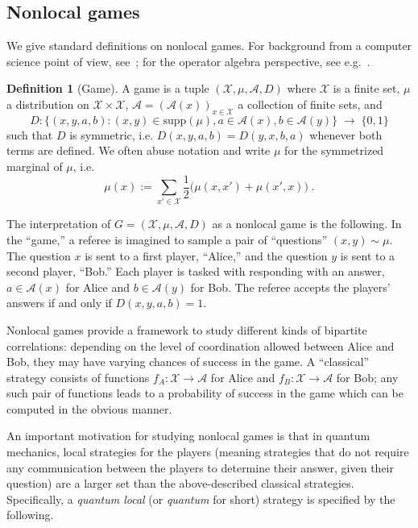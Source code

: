 \documentclass[11pt]{article}
\theoremstyle{definition}
\newtheorem{definition}[theorem]{Definition}
\newcommand{\mA}{\ensuremath{\mathcal{A}}}
\newcommand{\mX}{\ensuremath{\mathcal{X}}}
\begin{document}
\subsection{Nonlocal games}
\label{sec:nl-games}

We give standard definitions on nonlocal games. For background from a computer science point of view, see~\cite{cleve2004consequences}; for the operator algebra perspective, see e.g.~\cite{kim2018synchronous}.

\begin{definition}[Game]
A game is a tuple $(\mX,\mu,\mA,D)$ where $\mX$ is a finite set, $\mu$ a distribution on $\mX\times \mX$, $\mA=(\mA(x))_{x\in\mX}$ a collection of finite sets, and 
\[ D: \big\{ (x,y,a,b) : (x,y)\in\text{supp}(\mu),a\in\mA(x),b\in\mA(y)\big\} \;\to\;\{0,1\}\]
such that $D$ is symmetric, i.e. $D(x,y,a,b)=D(y,x,b,a)$ whenever both terms are defined. We often abuse notation and write $\mu$ for the symmetrized marginal of $\mu$, i.e.\ 
\[\mu(x) := \sum_{x'\in \mX} \frac{1}{2}\big(\mu(x,x')+\mu(x',x)\big)\;.\]
\end{definition}

The interpretation of $G=(\mX,\mu,\mA,D)$ as a nonlocal game is the following. In the ``game,'' a referee is imagined to sample a pair of ``questions'' $(x,y)\sim \mu$. The question $x$ is sent to a first player, ``Alice,'' and the question $y$ is sent to a second player, ``Bob.'' Each player is tasked with responding with an answer, $a\in \mA(x)$ for Alice and $b\in \mA(y)$ for Bob. The referee accepts the players' answers if and only if $D(x,y,a,b)=1$. 

Nonlocal games provide a framework to study different kinds of bipartite correlations: depending on the level of coordination allowed between Alice and Bob, they may have varying chances of success in the game. A ``classical'' strategy consists of functions $f_A:\mX\to\mA$ for Alice and $f_B:\mX\to\mA$ for Bob; any such pair of functions leads to a probability of success in the game which can be computed in the obvious manner. 

An important motivation for studying nonlocal games is that in quantum mechanics, local strategies for the players (meaning strategies that do not require any communication between the players to determine their answer, given their question) are a larger set than the above-described classical strategies. Specifically, a \emph{quantum local} (or \emph{quantum} for short) strategy is specified by the following. 
\end{document}
